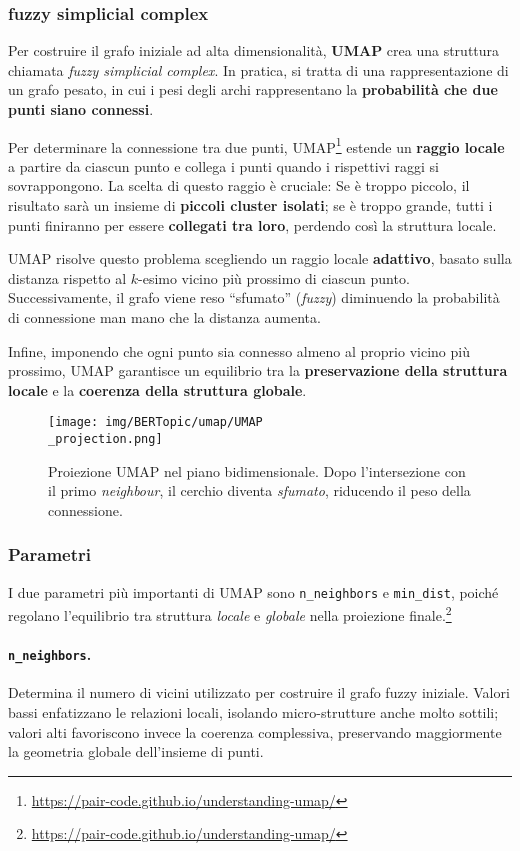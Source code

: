 \subsubsection{fuzzy simplicial complex}
Per costruire il grafo iniziale ad alta dimensionalità, \textbf{UMAP} crea una struttura chiamata \textit{fuzzy simplicial complex}. In pratica, si tratta di una rappresentazione di un grafo pesato, in cui i pesi degli archi rappresentano la \textbf{probabilità che due punti siano connessi}.

Per determinare la connessione tra due punti, UMAP\footnote{\url{https://pair-code.github.io/understanding-umap/}} estende un \textbf{raggio locale} a partire da ciascun punto e collega i punti quando i rispettivi raggi si sovrappongono. La scelta di questo raggio è cruciale:
Se è troppo piccolo, il risultato sarà un insieme di \textbf{piccoli cluster isolati};
se è troppo grande, tutti i punti finiranno per essere \textbf{collegati tra loro}, perdendo così la struttura locale.

UMAP risolve questo problema scegliendo un raggio locale \textbf{adattivo}, basato sulla distanza rispetto al $k$-esimo vicino più prossimo di ciascun punto. Successivamente, il grafo viene reso ``sfumato'' (\textit{fuzzy}) diminuendo la probabilità di connessione man mano che la distanza aumenta.

Infine, imponendo che ogni punto sia connesso almeno al proprio vicino più prossimo, UMAP garantisce un equilibrio tra la \textbf{preservazione della struttura locale} e la \textbf{coerenza della struttura globale}.
\begin{figure}[H]
\centering
\texttt{[image: img/BERTopic/umap/UMAP\\\_projection.png]}
\caption{Proiezione UMAP nel piano bidimensionale. Dopo l'intersezione con il primo \emph{neighbour}, il cerchio diventa \emph{sfumato}, riducendo il peso della connessione.\protect\footnotemark}
\label{fig:umap-projection}
\end{figure}
\subsubsection{Parametri}
I due parametri più importanti di UMAP sono \texttt{n\_neighbors} e \texttt{min\_dist}, poiché regolano l'equilibrio tra struttura \textit{locale} e \textit{globale} nella proiezione finale.\footnote{\url{https://pair-code.github.io/understanding-umap/}}

\paragraph{\texttt{n\_neighbors}.} Determina il numero di vicini utilizzato per costruire il grafo fuzzy iniziale. Valori bassi enfatizzano le relazioni locali, isolando micro-strutture anche molto sottili; valori alti favoriscono invece la coerenza complessiva, preservando maggiormente la geometria globale dell'insieme di punti.


